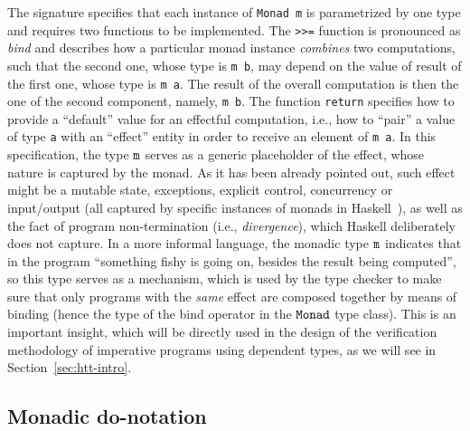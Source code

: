 The signature specifies that each instance of \texttt{Monad m} is
parametrized by one type and requires two functions to be implemented.
The \texttt{>>=} function is pronounced as \textit{bind} and describes how
a particular monad instance \textit{combines} two computations, such that the
second one, whose type is \texttt{m b}, may depend on the value of
result of the first one, whose type is \texttt{m a}. The result of
the overall computation is then the one of the second component, namely,
\texttt{m b}. The function \texttt{return} specifies how to
provide a ``default'' value for an effectful computation, i.e., how to
``pair'' a value of type \texttt{a} with an ``effect'' entity in order
to receive an element of \texttt{m a}.
In this specification, the type $\mathtt{m}$ serves as a generic
placeholder of the effect, whose nature is captured by the monad. As it
has been already pointed out, such effect might be a mutable state,
exceptions, explicit control, concurrency or input/output (all
captured by specific instances of monads in
Haskell~\cite{PeytonJones:squad}), as well as the fact of program
 non-termination (i.e., \textit{divergence}), which
Haskell deliberately does not capture. In a more informal language,
the monadic type $\mathtt{m}$ indicates that in the program ``something
fishy is going on, besides the result being computed'', so this type
serves as a mechanism, which is used by the type checker to make sure
that only programs with the \textit{same} effect are composed together by
means of binding (hence the type of the bind operator in the
$\mathtt{Monad}$ type class). This is an important insight, which will be
directly used in the design of the verification methodology of
imperative programs using dependent types, as we will see in
Section~\ref{sec:htt-intro}.
\subsection{Monadic do-notation}


